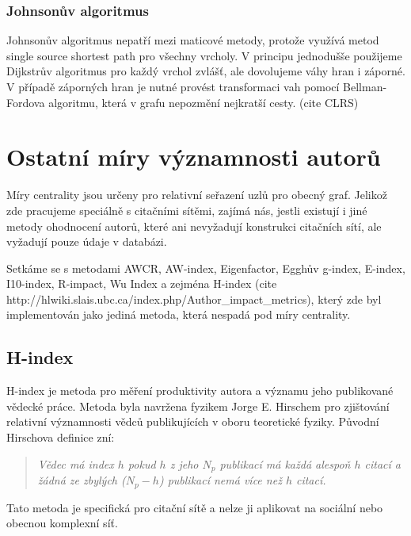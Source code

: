 \documentclass{bakalarka}
\begin{document}
\subsubsection{Johnsonův algoritmus}
Johnsonův algoritmus nepatří mezi maticové metody, protože využívá
metod single source shortest path pro všechny vrcholy. V principu jednodušše
použijeme Dijkstrův algoritmus pro každý vrchol zvlášť, ale dovolujeme váhy
hran i záporné. V případě záporných hran je nutné provést transformaci vah
pomocí Bellman-Fordova algoritmu, která v grafu nepozmění nejkratší cesty. 
(cite CLRS)


\section{Ostatní míry významnosti autorů}
Míry centrality jsou určeny pro relativní seřazení uzlů pro obecný graf.
Jelikož zde pracujeme speciálně s citačními sítěmi, zajímá nás, jestli existují
i jiné metody ohodnocení autorů, které ani nevyžadují konstrukci citačních
sítí, ale vyžadují pouze údaje v databázi.

Setkáme se s metodami AWCR, AW-index, Eigenfactor, Egghův g-index, E-index,
I10-index, R-impact, Wu Index a zejména H-index (cite http://hlwiki.slais.ubc.ca/index.php/Author\_impact\_metrics), který zde byl implementován
jako jediná metoda, která nespadá pod míry centrality.
\subsection{H-index}
H-index je metoda pro měření produktivity autora a významu jeho publikované
vědecké práce.  Metoda byla navržena fyzikem Jorge E. Hirschem pro zjištování
relativní významnosti vědců publikujících v oboru teoretické fyziky. Původní
Hirschova definice zní:

\begin{quote}\textit{
Vědec má index $h$ pokud $h$ z jeho $N_p$ publikací má každá alespoň $h$ citací
a žádná ze zbylých ($N_p - h$) publikací nemá více než $h$ citací.
}
\end{quote}

Tato metoda je specifická pro citační sítě a nelze ji aplikovat na sociální
nebo obecnou komplexní síť.
\end{document}

